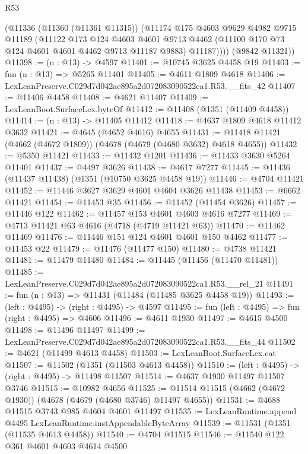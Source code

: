 \begin{lexlean}{R53}
\begin{coremodule}
        (@11336
          (@11360 (@11361 @11315))
          (@11174
            @175
            @4603
            @9629
            @4982
            @9715
            @11189
            (@11122
              @173
              @124
              @4603
              @4601
              @9713
              @4462
              (@11100 @170 @73 @124 @4601 @4601 @4462 @9713 @11187 @9883)
              @11187))))
      (@9842 @11321))
@11398 := (n : @13) -> @4597
@11401 := @10745 @3625 @4458 @19
@11403 := fun (n : @13) => @5265 @11401
@11405 := @4611 @1809 @4618
@11406 := LexLeanPreserve.C029d7d042ae895a2d072083090522ca1.R53.__fits_42
@11407 := @11406 @4458
@11408 := @4621 @11407
@11409 := LexLeanBoot.SurfaceLex.byteOf
@11412 := @11408 (@1351 (@11409 @4458))
@11414 := (n : @13) -> @11405 @11412
@11418 := @4637 @1809 @4618 @11412 @3632
@11421 := @4645 (@4652 @4616) @4655
@11431 := @11418 @11421 (@4662 (@4672 @1809)) (@4678 (@4679 (@4680 @3632) @4618 @4655))
@11432 := @5350 @11421
@11433 := @11432 @1201
@11436 := @11433 @3630 @5264 @11401
@11437 := @4497 @3626
@11438 := @4617 @7277
@11445 := @11436 (@11437 @11438) (@1351 (@10750 @3625 @4458 @19))
@11446 := @4704 @11421
@11452 := @11446 @3627 @3629 @4601 @4604 @3626 @11438
@11453 := @6662 @11421
@11454 := @11453 @35
@11456 := @11452 (@11454 @3626)
@11457 := @11446 @122
@11462 := @11457 @153 @4601 @4603 @4616 @7277
@11469 := @4713 @11421 @63 @4616 (@4718 (@4719 @11421 @63))
@11470 := @11462 @11469
@11476 := @11446 @151 @124 @4601 @4601 @150 @4462
@11477 := @11453 @22
@11479 := @11476 (@11477 @150)
@11480 := @4738 @11421
@11481 := @11479 @11480
@11484 := @11445 (@11456 (@11470 @11481))
@11485 := LexLeanPreserve.C029d7d042ae895a2d072083090522ca1.R53.__rel_21
@11491 := fun (n : @13) => @11431 (@11484 (@11485 @3625 @4458 @19))
@11493 := (left : @4495) -> (right : @4495) -> @4597
@11495 := fun (left : @4495) => fun (right : @4495) => @4606
@11496 := @4611 @1930
@11497 := @4615 @4500
@11498 := @11496 @11497
@11499 := LexLeanPreserve.C029d7d042ae895a2d072083090522ca1.R53.__fits_44
@11502 := @4621 (@11499 @4613 @4458)
@11503 := LexLeanBoot.SurfaceLex.cat
@11507 := @11502 (@1351 (@11503 @4613 @4458))
@11510 := (left : @4495) -> (right : @4495) -> @11498 @11507
@11514 := @4637 @1930 @11497 @11507 @3746
@11515 := @10982 @4656
@11525 := @11514 @11515 (@4662 (@4672 @1930)) (@4678 (@4679 (@4680 @3746) @11497 @4655))
@11531 := @4688 @11515 @3743 @985 @4604 @4601 @11497
@11535 := LexLeanRuntime.append @4495 LexLeanRuntime.instAppendableByteArray
@11539 := @11531 (@1351 (@11535 @4613 @4458))
@11540 := @4704 @11515
@11546 := @11540 @122 @361 @4601 @4603 @4614 @4500

\end{coremodule}
\end{lexlean}
